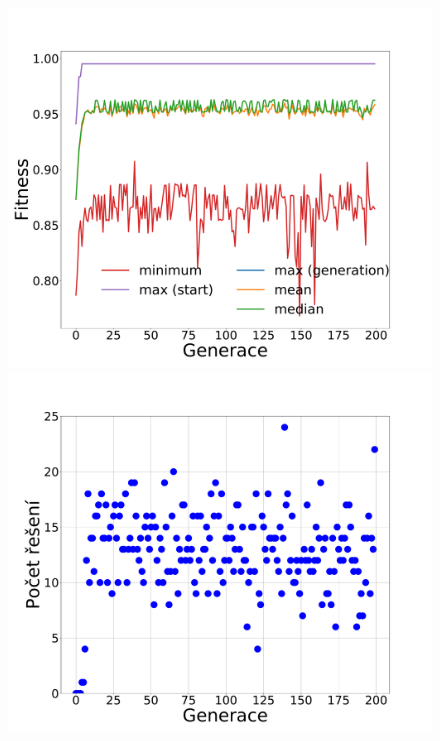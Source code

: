 \documentclass[11pt]{article}
\begin{document}
\begin{landscape}
\begin{figure}
\begin{minipage}[c]{0.35\textwidth}
        \centering\includegraphics[width=\textwidth]{img/m101g.pdf} 
    \end{minipage}
    \begin{minipage}[c]{0.35\textwidth}
        \centering \includegraphics[width=\textwidth]{img/m101s.pdf} 
    \end{minipage}
    \begin{minipage}[c]{0.35\textwidth}

\end{minipage}
\end{figure}
\end{landscape}
\end{document}
